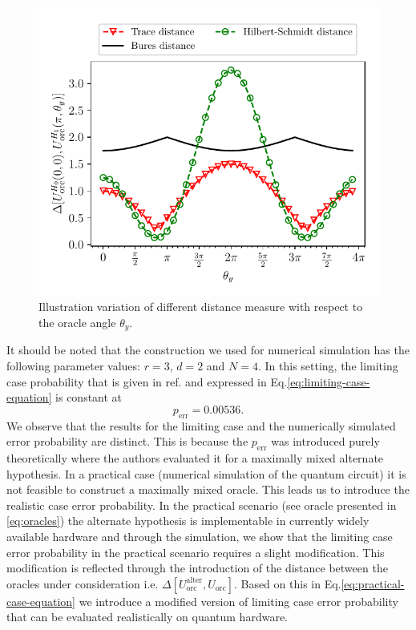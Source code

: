 \documentclass[%
 aps,
 jmp,%
 amsmath,amssymb,
 reprint,%
]{revtex4-2}
\begin{document}
\begin{figure}[t!]
	\centering
	\includegraphics[width = 1.0\linewidth]{diff_process_dist.pdf}
	\caption{Illustration variation of different distance measure with respect to the oracle angle $\theta_y$.}
	\label{fig:diff_dist_meas}
\end{figure}
It should be noted that the construction we used for numerical simulation has the following parameter values: $r=3$, $d=2$ and $N=4$. In this setting, the limiting case probability that is given in ref.\cite{chiribella2019quantum} and expressed in Eq.\eqref{eq:limiting-case-equation} is constant at
\begin{equation}
p_\textrm{err} = 0.00536.
\end{equation}
We observe that the results for the limiting case and the numerically simulated error probability are distinct. This is because the $p_\textrm{err}$ was introduced purely theoretically where the authors evaluated it for a maximally mixed alternate hypothesis. In a practical case (numerical simulation of the quantum circuit) it is not feasible to construct a maximally mixed oracle. This leads us to introduce the realistic case error probability. In the practical scenario (see oracle presented in \eqref{eq:oracles}) the alternate hypothesis is implementable in currently widely available hardware and through the simulation, we show that the limiting case error probability in the practical scenario requires a slight modification. This modification is reflected through the introduction of the distance between the oracles under consideration i.e. $\Delta\left[U_\textrm{orc}^\textrm{alter},U_\textrm{orc}\right]$. Based on this in Eq.\eqref{eq:practical-case-equation} we introduce a modified version of limiting case error probability that can be evaluated realistically on quantum hardware.
\end{document}
